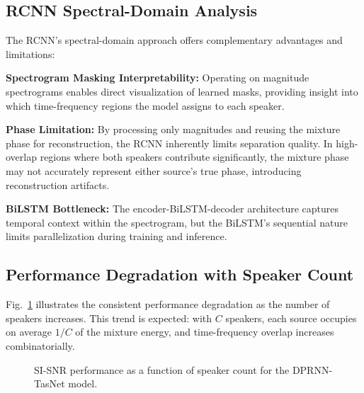 \documentclass[conference]{IEEEtran}
\begin{document}
\subsection{RCNN Spectral-Domain Analysis}

The RCNN's spectral-domain approach offers complementary advantages and limitations:

\textbf{Spectrogram Masking Interpretability:} Operating on magnitude spectrograms enables direct visualization of learned masks, providing insight into which time-frequency regions the model assigns to each speaker.

\textbf{Phase Limitation:} By processing only magnitudes and reusing the mixture phase for reconstruction, the RCNN inherently limits separation quality. In high-overlap regions where both speakers contribute significantly, the mixture phase may not accurately represent either source's true phase, introducing reconstruction artifacts.

\textbf{BiLSTM Bottleneck:} The encoder-BiLSTM-decoder architecture captures temporal context within the spectrogram, but the BiLSTM's sequential nature limits parallelization during training and inference.

\subsection{Performance Degradation with Speaker Count}

Fig.~\ref{fig:degradation} illustrates the consistent performance degradation as the number of speakers increases. This trend is expected: with $C$ speakers, each source occupies on average $1/C$ of the mixture energy, and time-frequency overlap increases combinatorially.

\begin{figure}[t]
\centering
{}
\caption{SI-SNR performance as a function of speaker count for the DPRNN-TasNet model.}
\label{fig:degradation}
\end{figure}
\end{document}
